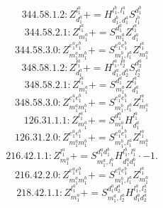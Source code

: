 \documentclass[letterpaper,10pt,fleqn,leqno,onecolumn]{article}
\begin{document}
\begin{equation} \;\;\;\;\;\;  344.58.1.2: Z^{l_{1}^{a}}_{d_{1}^{a}}+=H^{l_{1}^{b},l_{1}^{a}}_{d_{1}^{b},d_{1}^{a}}S^{d_{1}^{b}}_{l_{1}^{b}} \end{equation}
\begin{equation} \;\;\;\;\;\;  344.58.2.1: Z^{l_{1}^{a}}_{m_{1}^{a}}+=S^{d_{1}^{a}}_{m_{1}^{a}}Z^{l_{1}^{a}}_{d_{1}^{a}} \end{equation}
\begin{equation} \;\;\;\;\;\;  344.58.3.0: Z^{e_{1}^{a}e_{1}^{b}}_{m_{1}^{a}m_{1}^{b}}+=S^{e_{1}^{a}e_{1}^{b}}_{m_{1}^{b},l_{1}^{a}}Z^{l_{1}^{a}}_{m_{1}^{a}} \end{equation}
\begin{equation} \;\;\;\;\;\;  348.58.1.2: Z^{l_{1}^{a}}_{d_{1}^{a}}+=H^{l_{1}^{a},l_{2}^{a}}_{d_{1}^{a},d_{2}^{a}}S^{d_{2}^{a}}_{l_{2}^{a}} \end{equation}
\begin{equation} \;\;\;\;\;\;  348.58.2.1: Z^{l_{1}^{a}}_{m_{1}^{a}}+=S^{d_{1}^{a}}_{m_{1}^{a}}Z^{l_{1}^{a}}_{d_{1}^{a}} \end{equation}
\begin{equation} \;\;\;\;\;\;  348.58.3.0: Z^{e_{1}^{a}e_{1}^{b}}_{m_{1}^{a}m_{1}^{b}}+=S^{e_{1}^{a}e_{1}^{b}}_{m_{1}^{b},l_{1}^{a}}Z^{l_{1}^{a}}_{m_{1}^{a}} \end{equation}
\begin{equation} \;\;\;\;\;\;  126.31.1.1: Z^{l_{1}^{a}}_{m_{1}^{a}}+=S^{d_{1}^{a}}_{m_{1}^{a}}H^{l_{1}^{a}}_{d_{1}^{a}} \end{equation}
\begin{equation} \;\;\;\;\;\;  126.31.2.0: Z^{e_{1}^{a}e_{1}^{b}}_{m_{1}^{a}m_{1}^{b}}+=S^{e_{1}^{a}e_{1}^{b}}_{m_{1}^{b},l_{1}^{a}}Z^{l_{1}^{a}}_{m_{1}^{a}} \end{equation}
\begin{equation} \;\;\;\;\;\;  216.42.1.1: Z^{l_{1}^{a}}_{m_{1}^{a}}+=S^{d_{1}^{a}d_{1}^{b}}_{m_{1}^{a},l_{1}^{b}}H^{l_{1}^{b},l_{1}^{a}}_{d_{1}^{a}d_{1}^{b}}\cdot -1. \end{equation}
\begin{equation} \;\;\;\;\;\;  216.42.2.0: Z^{e_{1}^{a}e_{1}^{b}}_{m_{1}^{a}m_{1}^{b}}+=S^{e_{1}^{a}e_{1}^{b}}_{m_{1}^{b},l_{1}^{a}}Z^{l_{1}^{a}}_{m_{1}^{a}} \end{equation}
\begin{equation} \;\;\;\;\;\;  218.42.1.1: Z^{l_{1}^{a}}_{m_{1}^{a}}+=S^{d_{1}^{a}d_{2}^{a}}_{m_{1}^{a},l_{2}^{a}}H^{l_{1}^{a},l_{2}^{a}}_{d_{1}^{a}d_{2}^{a}} \end{equation}
\end{document}
